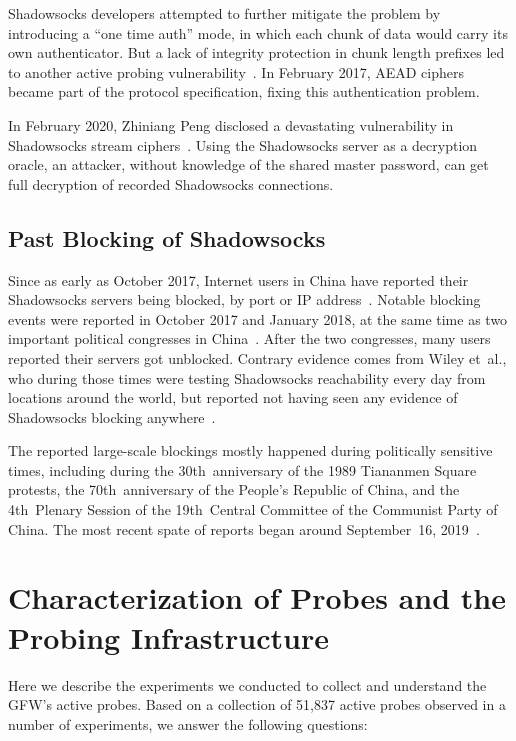 \documentclass[sigconf,letterpaper]{acmart}
\begin{document}
Shadowsocks developers attempted to further mitigate the problem
by introducing a ``one time auth'' mode, in which each chunk of data
would carry its own authenticator.
But a lack of integrity protection in chunk length prefixes
led to another active probing vulnerability~\cite{printempw2017, Fifield2017-summary}.
In February 2017, AEAD ciphers became part of the protocol specification,
fixing this authentication problem.

In February 2020, Zhiniang Peng disclosed a devastating vulnerability in Shadowsocks stream ciphers~\cite{Peng2020Redirect, Fifield2020Redirect}.
Using the Shadowsocks server as a decryption oracle,
an attacker,
without knowledge of the shared master password,
can get full decryption of recorded Shadowsocks connections.

\subsection{Past Blocking of Shadowsocks}
\label{sec:historical-blocking}
Since as early as October 2017,
Internet users in China have reported their Shadowsocks servers being blocked,
by port or IP address~\cite{bbs2017blocking, Programthink-Reports2017, Scott-Reports2017}.
Notable blocking events were reported in October 2017 and January 2018,
at the same time as
two important political congresses in China~\cite{bbs2017blocking}.
After the two congresses,
many users reported their servers got unblocked.
Contrary evidence comes from Wiley et~al.,
who during those times were testing Shadowsocks reachability every day
from locations around the world,
but reported not having seen any evidence of Shadowsocks blocking anywhere~\cite{Wiley-Reports2017}.

The reported large-scale blockings mostly happened during politically sensitive times,
including during the 30th~anniversary of the 1989 Tiananmen Square protests,
the 70th~anniversary of the People's Republic of China,
and the 4th~Plenary Session of the 19th~Central Committee of the Communist Party of China.
The most recent spate of reports began around September~16, 2019~\cite{Fifield2019blocking}.

\section{Characterization of Probes and the Probing Infrastructure}
\label{sec:characterization}

Here we describe the experiments we conducted to collect and understand the GFW's active probes.
Based on a collection of 51,837 active probes observed in a number of experiments, we answer the following questions:
\end{document}
